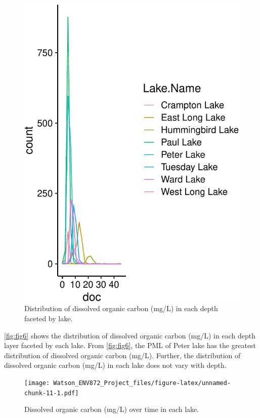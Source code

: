 \documentclass[12pt,]{article}
\begin{document}
\begin{figure}
\centering
\includegraphics{Watson_ENV872_Project_files/figure-latex/unnamed-chunk-10-1.pdf}
\caption{\label{fig:fig6}Distribution of dissolved organic carbon (mg/L)
in each depth faceted by lake.}
\end{figure}

\autoref{fig:fig6} shows the distribution of dissolved organic carbon
(mg/L) in each depth layer faceted by each lake. From
\autoref{fig:fig6}, the PML of Peter lake has the greatest distribution
of dissolved organic carbon (mg/L). Further, the distribution of
dissolved organic carbon (mg/L) in each lake does not vary with depth.

\begin{figure}
\centering
\texttt{[image: Watson\_ENV872\_Project\_files/figure-latex/unnamed-chunk-11-1.pdf]}
\caption{\label{fig:fig7} Dissolved organic carbon (mg/L) over time in
each lake.}
\end{figure}
\end{document}
